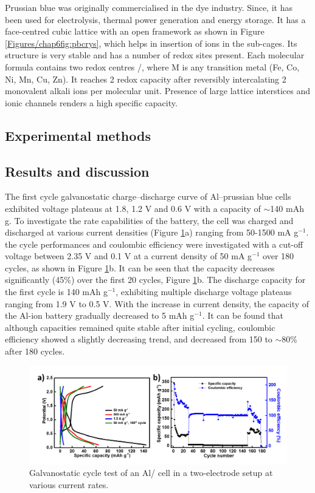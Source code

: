 Prussian blue was originally commercialised in the dye industry. Since, it has been used for electrolysis, thermal power generation and energy storage. It has a face-centred cubic lattice with an open framework as shown in Figure \ref{Figures/chap6fig:pbcrys}, which helps in insertion of ions in the sub-cages. Its structure is very stable and has a number of redox sites present. Each molecular formula contains two redox centres /, where M is any transition metal (Fe, Co, Ni, Mn, Cu, Zn). It reaches 2 redox capacity after reversibly intercalating 2 monovalent alkali ions per molecular unit. Presence of large lattice interstices and ionic channels renders a high specific capacity. 

\subsection{Experimental methods}
\subsection{Results and discussion}
The first cycle galvanostatic charge–discharge curve of Al–prussian blue cells exhibited voltage plateaus at 1.8, 1.2 V and 0.6 V with a capacity of $\sim$140 mAh g. To investigate the rate capabilities of the battery, the cell was charged and discharged at various current densities (Figure \ref{Figures/chap6fig:pbCDC2}a) ranging from 50-1500 mA g$^{-1}$. the cycle performances and coulombic efficiency were investigated with a cut-off voltage between 2.35 V and 0.1 V at a current density of 50 mA g$^{-1}$ over 180 cycles, as shown in Figure \ref{Figures/chap6fig:pbCDC2}b. It can be seen that the capacity decreases significantly (45\%) over the first 20 cycles, Figure \ref{Figures/chap6fig:pbCDC2}b. The discharge capacity for the first cycle is 140 mAh g$^{-1}$, exhibiting multiple discharge voltage plateaus ranging from 1.9 V to 0.5 V. With the increase in current density, the capacity of the Al-ion battery gradually decreased to 5 mAh g$^{-1}$. It can be found that although capacities remained quite stable after initial cycling, coulombic efficiency showed a slightly decreasing trend, and decreased from 150 to $\sim$80\% after 180 cycles. 

 \begin{figure}[tbh!]
  \centering
  \includegraphics[width=\textwidth]{Figures/chap6fig/pbCDC2}
    \caption{Galvanostatic cycle test of an Al/ cell in a two-electrode setup at various current rates.}
  \label{Figures/chap6fig:pbCDC2}
\end{figure}

